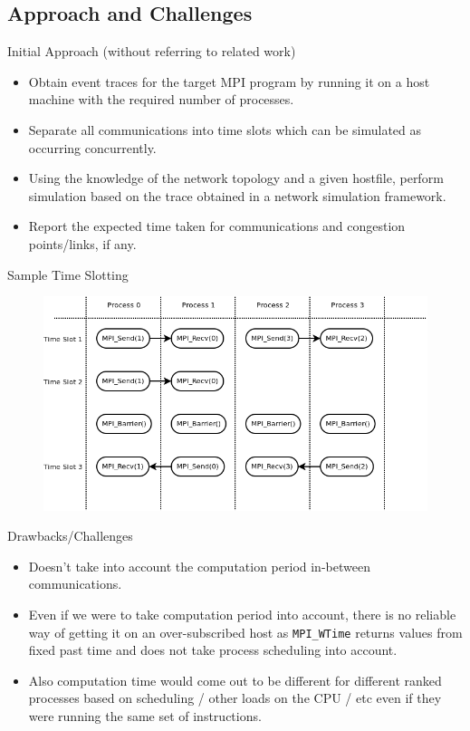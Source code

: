 \documentclass[pdf]{beamer}
\begin{document}
\subsection{Approach and Challenges}
\begin{frame}{Initial Approach (without referring to related work)}
  \begin{itemize}
    \item<1-> Obtain event traces for the target MPI program by running it on a
      host machine with the required number of processes.
    \item<2-> Separate all communications into time slots which can be simulated
      as occurring concurrently.
    \item<3-> Using the knowledge of the network topology and a given hostfile,
      perform simulation based on the trace obtained in a network simulation
      framework.
    \item<4-> Report the expected time taken for communications and congestion
      points/links, if any.
  \end{itemize}
\end{frame}
\begin{frame}{Sample Time Slotting}
  \begin{figure}[ht]
    \begin{center}
      \includegraphics[width=\textwidth]{time-slots}
    \end{center}
  \end{figure}
\end{frame}
\begin{frame}{Drawbacks/Challenges}
  \begin{itemize}
    \item<1-> Doesn't take into account the computation period in-between
      communications.
    \item<2-> Even if we were to take computation period into account, there is
      no reliable way of getting it on an over-subscribed host as
      \texttt{MPI\_WTime} returns values from fixed past time and does not take
      process scheduling into account.
    \item<3-> Also computation time would come out to be different for different
      ranked processes based on scheduling / other loads on the CPU / etc even
      if they were running the same set of instructions.
  \end{itemize}
\end{frame}
\end{document}
